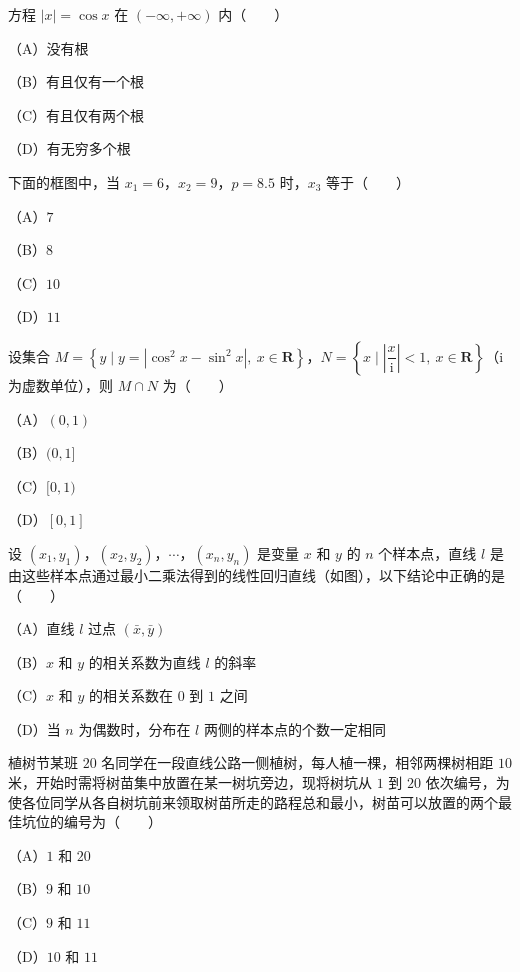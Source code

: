 \begin{question}
方程 $|x|=\cos x$ 在 $(-\infty,+\infty)$ 内\mbox{（　　）}

（A）没有根

（B）有且仅有一个根

（C）有且仅有两个根

（D）有无穷多个根

\Needspace{0.4\textheight}
\end{question}
\begin{question}
下面的框图中，当 $x_1=6$，$x_2=9$，$p=8.5$ 时，$x_3$ 等于\mbox{（　　）}

（A）$7$

（B）$8$

（C）$10$

（D）$11$
\nopagebreak[4]
\begin{center}\end{center}
\nopagebreak[4]
\end{question}
\begin{question}
设集合 $M=\left\{y\mid y=|\cos^2x-\sin^2x|,\ x\in\mathbf R\right\}$，$N=\left\{x\mid\left|\dfrac x{\mathrm i}\right|<1,\ x\in\mathbf R\right\}$（$\mathrm i$ 为虚数单位），则 $M\cap N$ 为\mbox{（　　）}

（A）$(0,1)$

（B）$(0,1]$

（C）$[0,1)$

（D）$[0,1]$

\Needspace{0.4\textheight}
\end{question}
\begin{question}
设 $(x_1,y_1)$，$(x_2,y_2)$，$\cdots$，$(x_n,y_n)$ 是变量 $x$ 和 $y$ 的 $n$ 个样本点，直线 $l$ 是由这些样本点通过最小二乘法得到的线性回归直线（如图），以下结论中正确的是\mbox{（　　）}

（A）直线 $l$ 过点 $(\bar x,\bar y)$

（B）$x$ 和 $y$ 的相关系数为直线 $l$ 的斜率

（C）$x$ 和 $y$ 的相关系数在 $0$ 到 $1$ 之间

（D）当 $n$ 为偶数时，分布在 $l$ 两侧的样本点的个数一定相同
\nopagebreak[4]
\begin{center}\end{center}
\nopagebreak[4]
\end{question}
\begin{question}
植树节某班 $20$ 名同学在一段直线公路一侧植树，每人植一棵，相邻两棵树相距 $10$ 米，开始时需将树苗集中放置在某一树坑旁边，现将树坑从 $1$ 到 $20$ 依次编号，为使各位同学从各自树坑前来领取树苗所走的路程总和最小，树苗可以放置的两个最佳坑位的编号为\mbox{（　　）}

（A）$1$ 和 $20$

（B）$9$ 和 $10$

（C）$9$ 和 $11$

（D）$10$ 和 $11$

\end{question}

